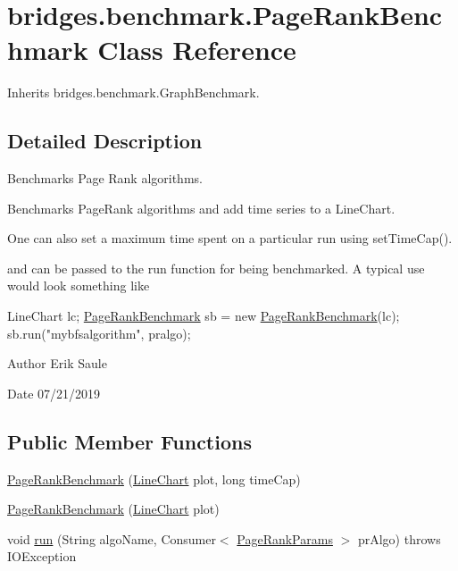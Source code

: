 \hypertarget{classbridges_1_1benchmark_1_1_page_rank_benchmark}{}\section{bridges.\+benchmark.\+Page\+Rank\+Benchmark Class Reference}
\label{classbridges_1_1benchmark_1_1_page_rank_benchmark}


Inherits bridges.\+benchmark.\+Graph\+Benchmark.



\subsection{Detailed Description}
Benchmarks Page Rank algorithms. 

Benchmarks Page\+Rank algorithms and add time series to a Line\+Chart.

One can also set a maximum time spent on a particular run using set\+Time\+Cap().

and can be passed to the run function for being benchmarked. A typical use would look something like


\begin{DoxyCode}
LineChart lc;
\mbox{\hyperlink{classbridges_1_1benchmark_1_1_page_rank_benchmark_afd361f9cae2425b44794e2599cc25af1}{PageRankBenchmark}} sb  = \textcolor{keyword}{new} \mbox{\hyperlink{classbridges_1_1benchmark_1_1_page_rank_benchmark_afd361f9cae2425b44794e2599cc25af1}{PageRankBenchmark}}(lc);
sb.run(\textcolor{stringliteral}{"mybfsalgorithm"}, pralgo);
\end{DoxyCode}


\begin{DoxyAuthor}{Author}
Erik Saule 
\end{DoxyAuthor}
\begin{DoxyDate}{Date}
07/21/2019 
\end{DoxyDate}
\subsection*{Public Member Functions}
\begin{DoxyCompactItemize}
\item 
\mbox{\hyperlink{classbridges_1_1benchmark_1_1_page_rank_benchmark_afd361f9cae2425b44794e2599cc25af1}{Page\+Rank\+Benchmark}} (\mbox{\hyperlink{classbridges_1_1base_1_1_line_chart}{Line\+Chart}} plot, long time\+Cap)
\item 
\mbox{\hyperlink{classbridges_1_1benchmark_1_1_page_rank_benchmark_a3a74e3703d4bc24b02a9dcb59b976792}{Page\+Rank\+Benchmark}} (\mbox{\hyperlink{classbridges_1_1base_1_1_line_chart}{Line\+Chart}} plot)
\item 
void \mbox{\hyperlink{classbridges_1_1benchmark_1_1_page_rank_benchmark_a6738599d19f7a856a16615f69050c8b3}{run}} (String algo\+Name, Consumer$<$ \mbox{\hyperlink{classbridges_1_1benchmark_1_1_page_rank_params}{Page\+Rank\+Params}} $>$ pr\+Algo)  throws I\+O\+Exception 
\end{DoxyCompactItemize}



